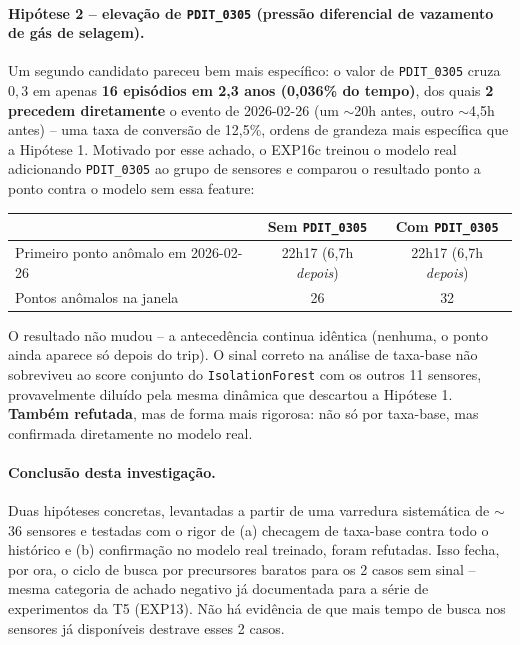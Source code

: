 \documentclass[11pt,a4paper]{article}
\begin{document}
\paragraph{Hipótese 2 -- elevação de \texttt{PDIT\_0305} (pressão diferencial
de vazamento de gás de selagem).}
Um segundo candidato pareceu bem mais específico: o valor de
\texttt{PDIT\_0305} cruza $0{,}3$ em apenas \textbf{16 episódios em 2,3
anos (0,036\% do tempo)}, dos quais \textbf{2 precedem diretamente} o
evento de 2026-02-26 (um $\sim$20h antes, outro $\sim$4,5h antes) -- uma
taxa de conversão de 12,5\%, ordens de grandeza mais específica que a
Hipótese 1. Motivado por esse achado, o EXP16c treinou o modelo real
adicionando \texttt{PDIT\_0305} ao grupo de sensores e comparou o
resultado ponto a ponto contra o modelo sem essa feature:

\begin{center}
\begin{tabular}{lcc}
\toprule
& Sem \texttt{PDIT\_0305} & Com \texttt{PDIT\_0305} \\
\midrule
Primeiro ponto anômalo em 2026-02-26 & 22h17 (6,7h \emph{depois}) & 22h17 (6,7h \emph{depois}) \\
Pontos anômalos na janela & 26 & 32 \\
\bottomrule
\end{tabular}
\end{center}

O resultado não mudou -- a antecedência continua idêntica (nenhuma, o
ponto ainda aparece só depois do trip). O sinal correto na análise de
taxa-base não sobreviveu ao score conjunto do \texttt{IsolationForest} com
os outros 11 sensores, provavelmente diluído pela mesma dinâmica que
descartou a Hipótese 1. \textbf{Também refutada}, mas de forma mais
rigorosa: não só por taxa-base, mas confirmada diretamente no modelo real.

\paragraph{Conclusão desta investigação.} Duas hipóteses concretas,
levantadas a partir de uma varredura sistemática de $\sim$36 sensores e
testadas com o rigor de (a) checagem de taxa-base contra todo o histórico e
(b) confirmação no modelo real treinado, foram refutadas. Isso fecha, por
ora, o ciclo de busca por precursores baratos para os 2 casos sem sinal --
mesma categoria de achado negativo já documentada para a série de
experimentos da T5 (EXP13). Não há evidência de que mais tempo de busca
nos sensores já disponíveis destrave esses 2 casos.
\end{document}
